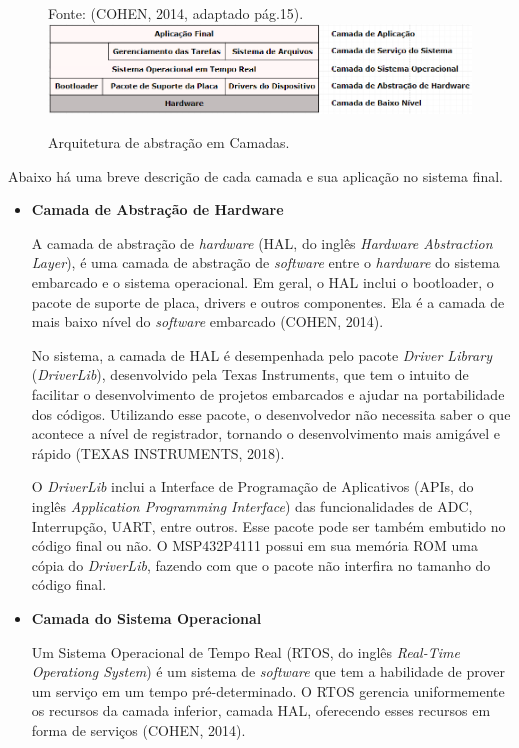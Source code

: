 \begin{figure}[h]
	\centering
	
	Fonte: (COHEN, 2014,  adaptado pág.15).
	\includegraphics[keepaspectratio=true,scale=0.68]{figuras/arquiteturaSof.PNG}
	\caption{Arquitetura de abstração em Camadas.}
	\label{fig22}
\end{figure}
\FloatBarrier
Abaixo há uma breve descrição de cada camada e sua aplicação no sistema final.

\begin{itemize}
	\item \textbf{Camada de Abstração de Hardware} 
	
	A camada de abstração de \textit{hardware} (HAL, do inglês \textit{Hardware Abstraction Layer}), é uma camada de abstração de \textit{software} entre o \textit{hardware} do sistema embarcado e o sistema operacional. Em geral, o HAL inclui o bootloader, o pacote de suporte de placa, drivers e outros componentes. Ela é a camada de mais baixo nível do \textit{software} embarcado (COHEN, 2014).
	
	No sistema, a camada de HAL é desempenhada pelo pacote \textit{Driver Library} (\textit{DriverLib}), desenvolvido pela Texas Instruments, que tem o intuito de facilitar o desenvolvimento de projetos embarcados e ajudar na portabilidade dos códigos. Utilizando esse pacote, o desenvolvedor não necessita saber o que acontece a nível de registrador, tornando o desenvolvimento mais amigável e rápido  (TEXAS INSTRUMENTS, 2018).
	
	O \textit{DriverLib} inclui a Interface de Programação de Aplicativos (APIs, do inglês \textit{Application Programming Interface}) das funcionalidades de ADC, Interrupção, UART, entre outros. Esse pacote pode ser também embutido no código final ou não. O MSP432P4111 possui em sua memória ROM uma cópia do \textit{DriverLib}, fazendo com que o pacote não interfira no tamanho do código final.
	
	\item \textbf{Camada do Sistema Operacional}
	
	Um Sistema Operacional de Tempo Real (RTOS, do inglês \textit{Real-Time Operationg System}) é um sistema de \textit{software} que tem a habilidade de prover um serviço em um tempo pré-determinado. O RTOS gerencia uniformemente os recursos da camada inferior, camada HAL, oferecendo esses recursos em forma de serviços (COHEN, 2014).
	

\end{itemize}
